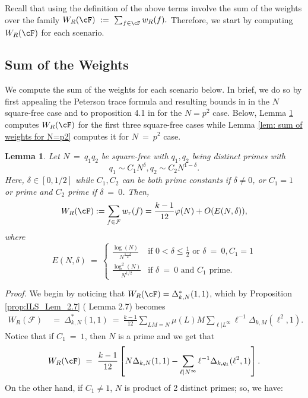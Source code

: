 \documentclass[11pt, reqno]{amsart}
\newtheorem{lemma}[theorem]{Lemma}
\theoremstyle{definition}
\theoremstyle{remark}
\numberwithin{equation}{section}
\begin{document}
Recall that using the definition of the above terms involve the sum of the weights over the family $W_R(\cF)\ := \ \sum_{f\in \cF} w_R(f).$ Therefore, we start by computing $W_R(\cF)$ for each scenario.

\subsection{Sum of the Weights}
We compute the sum of the weights for each scenario below. In brief, we do so by first appealing the Peterson trace formula and resulting bounds in \cite{ILS2} in the $N$ square-free case and to proposition 4.1 in \cite{BarrettEtAl2016arXiv} for the $N = p^2$ case. Below, Lemma \ref{lem: sum of weights squarefree} computes $W_R(\cF)$ for the first three square-free cases while Lemma \ref{lem: sum of weights for N=p2} computes it for $N\ =\ p^2$ case.
\begin{lemma}\label{lem: sum of weights squarefree}
    Let $N\ =\ q_1q_2$ be square-free with $q_1,q_2$ being  distinct primes with $$q_1\sim C_1N^{\delta},q_2\sim C_2N^{1-\delta}.$$ Here, $\delta \in [0,1/2]$ while $C_1,C_2$ can be both prime constants if $\delta\neq0$, or $C_1=1$ or prime  and $C_2$ prime if $\delta \ =\ 0$. Then,
  \begin{align}
     W_R(\cF):= \sum_{f \in \mathcal{F}}w_r(f)=\frac{k-1}{12}\varphi(N)+O(E(N, \delta)),
  \end{align}
    where
    \[
    E(N,\delta)\ =\  
    \begin{cases}
    \frac{\log(N)}{N^{\frac{1-\delta}{2}}} & \text{if } 0< \delta \leq \frac{1}{2} \text{ or } \delta\ =\ 0, C_1=1 \\[1.5ex]
    \frac{\log^2(N)}{N^{1/2}} & \text{if } \delta \ =\  0 \text{ and } C_1 \text{ prime}.
    \end{cases}
    \]\label{lem:sum of weights}
\end{lemma}
\textit{Proof.} We begin by noticing that $W_R(\cF) = \Delta_{k,N}^*(1,1)$, which by Proposition \ref{prop:ILS_Lem_2.7} (\cite{ILS2} Lemma 2.7) becomes
\begin{align}
W_R(\mathcal{F})\ &=\ \Delta^{*}_{k,N}(1,1)\ =\ \frac{k-1}{12}\sum_{LM=N}\mu(L)M\sum_{\ell|L^{\infty}}\ell^{-1}\Delta_{k,M}(\ell^2,1).
\end{align}
Notice that if $C_1\ =\ 1$, then $N$ is a prime and we get that $$W_R(\cF)\ =\ \frac{k-1}{12}\left[N\Delta_{k,N}(1,1)-\sum_{\ell|N^{\infty}}\ell^{-1}\Delta_{k,q_1}(\ell^2,1)\right].$$ On the other hand, if $C_1 \neq 1$, $N$ is product of 2 distinct primes; so, we have: 
\end{document}
